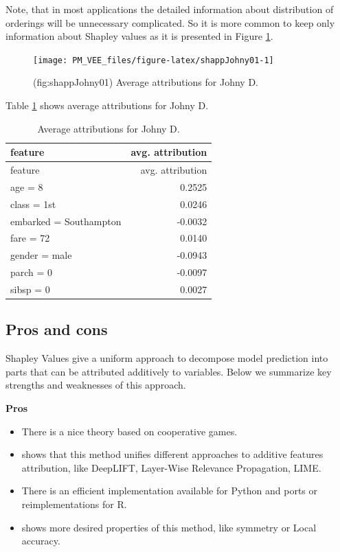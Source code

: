 \documentclass[12pt,]{krantz}
\providecommand{\tightlist}{%
  \setlength{\itemsep}{0pt}\setlength{\parskip}{0pt}}
\theoremstyle{definition}
\theoremstyle{definition}
\theoremstyle{definition}
\theoremstyle{remark}
\begin{document}
Note, that in most applications the detailed information about
distribution of orderings will be unnecessary complicated. So it is more
common to keep only information about Shapley values as it is presented
in Figure \ref{fig:shappJohny01}.

\begin{figure}

{\centering \texttt{[image: PM\_VEE\_files/figure-latex/shappJohny01-1]} 

}

\caption{(fig:shappJohny01) Average attributions for Johny D. }\label{fig:shappJohny01}
\end{figure}

Table \ref{tab:shapOrderingTable} shows average attributions for Johny
D.

\begin{longtable}[]{@{}lr@{}}
\caption{\label{tab:shapOrderingTable} Average attributions for Johny
D.}\tabularnewline
\toprule
feature & avg. attribution\tabularnewline
\midrule
\endfirsthead
\toprule
feature & avg. attribution\tabularnewline
\midrule
\endhead
age = 8 & 0.2525\tabularnewline
class = 1st & 0.0246\tabularnewline
embarked = Southampton & -0.0032\tabularnewline
fare = 72 & 0.0140\tabularnewline
gender = male & -0.0943\tabularnewline
parch = 0 & -0.0097\tabularnewline
sibsp = 0 & 0.0027\tabularnewline
\bottomrule
\end{longtable}

\hypertarget{pros-and-cons-2}{%
\subsection{Pros and cons}\label{pros-and-cons-2}}

Shapley Values give a uniform approach to decompose model prediction
into parts that can be attributed additively to variables. Below we
summarize key strengths and weaknesses of this approach.

\textbf{Pros}

\begin{itemize}
\tightlist
\item
  There is a nice theory based on cooperative games.
\item
  \citep{SHAP} shows that this method unifies different approaches to
  additive features attribution, like DeepLIFT, Layer-Wise Relevance
  Propagation, LIME.
\item
  There is an efficient implementation available for Python and ports or
  reimplementations for R.
\item
  \citep{SHAP} shows more desired properties of this method, like
  symmetry or Local accuracy.
\end{itemize}
\end{document}
